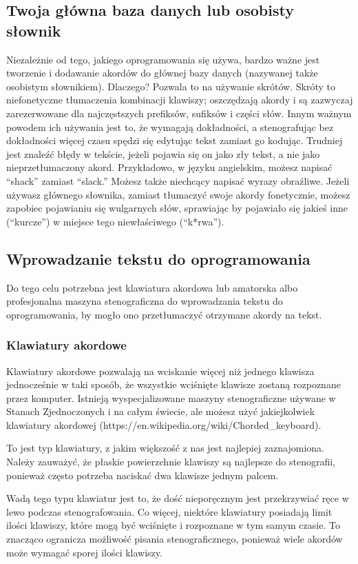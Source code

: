 \documentclass[12p, oneside]{book}
\begin{document}
\subsection{Twoja główna baza danych lub osobisty słownik}
Niezależnie od tego, jakiego oprogramowania się używa, bardzo ważne jest tworzenie i dodawanie akordów do głównej bazy danych (nazywanej także osobistym słownikiem). Dlaczego? Pozwala to na używanie skrótów. Skróty to niefonetyczne tłumaczenia kombinacji klawiszy; oszczędzają akordy i są zazwyczaj zarezerwowane dla najczęstszych prefiksów, sufiksów i części słów. Innym ważnym powodem ich używania jest to, że wymagają dokładności, a stenografując bez dokładności więcej czasu spędzi się edytując tekst zamiast go kodując. Trudniej jest znaleźć błędy w tekście, jeżeli pojawia się on jako zły tekst, a nie jako nieprzetłumaczony akord. Przykładowo, w języku angielskim, możesz napisać “shack” zamiast “slack.” Możesz także niechcący napisać wyrazy obraźliwe. Jeżeli używasz głównego słownika, zamiast tłumaczyć swoje akordy fonetycznie, możesz zapobiec pojawianiu się wulgarnych słów, sprawiając by pojawiało się jakieś inne (“kurcze”) w miejsce tego niewłaściwego (“k*rwa”).

\subsection{Wprowadzanie tekstu do oprogramowania}
Do tego celu potrzebna jest klawiatura akordowa lub amatorska albo profesjonalna maszyna stenograficzna do wprowadzania tekstu do oprogramowania, by mogło ono przetłumaczyć otrzymane akordy na tekst.

\subsubsection{Klawiatury akordowe}
Klawiatury akordowe pozwalają na wciskanie więcej niż jednego klawisza jednocześnie w taki sposób, że wszystkie wciśnięte klawisze zostaną rozpoznane przez komputer. Istnieją wyspecjalizowane maszyny stenograficzne używane w Stanach Zjednoczonych i na całym świecie, ale możesz użyć jakiejkolwiek klawiatury akordowej (https://en.wikipedia.org/wiki/Chorded\_keyboard).

To jest typ klawiatury, z jakim większość z nas jest najlepiej zaznajomiona. Należy zauważyć, że płaskie powierzchnie klawiszy są najlepsze do stenografii, ponieważ często potrzeba naciskać dwa klawisze jednym palcem.

Wadą tego typu klawiatur jest to, że dość nieporęcznym jest przekrzywiać ręce w lewo podczas stenografowania. Co więcej, niektóre klawiatury posiadają limit ilości klawiszy, które mogą być wciśnięte  i rozpoznane w tym samym czasie. To znacząco ogranicza możliwość pisania stenograficznego, ponieważ wiele akordów może wymagać sporej ilości klawiszy.
\end{document}
